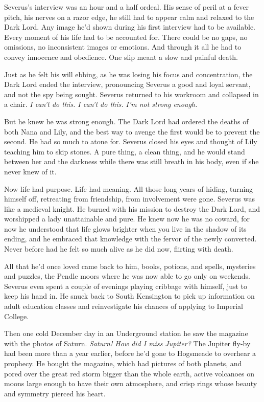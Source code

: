 Severus's interview was an hour and a half ordeal. His sense of peril at a fever pitch, his nerves on a razor edge, he still had to appear calm and relaxed to the Dark Lord. Any image he'd shown during his first interview had to be available. Every moment of his life had to be accounted for. There could be no gaps, no omissions, no inconsistent images or emotions. And through it all he had to convey innocence and obedience. One slip meant a slow and painful death.

Just as he felt his will ebbing, as he was losing his focus and concentration, the Dark Lord ended the interview, pronouncing Severus a good and loyal servant, and not the spy being sought. Severus returned to his workroom and collapsed in a chair. \emph{I can't do this. I can't do this. I'm not strong enough.}

But he knew he was strong enough. The Dark Lord had ordered the deaths of both Nana and Lily, and the best way to avenge the first would be to prevent the second. He had so much to atone for. Severus closed his eyes and thought of Lily teaching him to skip stones. A pure thing, a clean thing, and he would stand between her and the darkness while there was still breath in his body, even if she never knew of it.

Now life had purpose. Life had meaning. All those long years of hiding, turning himself off, retreating from friendship, from involvement were gone. Severus was like a medieval knight. He burned with his mission to destroy the Dark Lord, and worshipped a lady unattainable and pure. He knew now he was no coward, for now he understood that life glows brighter when you live in the shadow of its ending, and he embraced that knowledge with the fervor of the newly converted. Never before had he felt so much alive as he did now, flirting with death.

All that he'd once loved came back to him, books, potions, and spells, mysteries and puzzles, the Pendle moors where he was now able to go only on weekends. Severus even spent a couple of evenings playing cribbage with himself, just to keep his hand in. He snuck back to South Kensington to pick up information on adult education classes and reinvestigate his chances of applying to Imperial College.

Then one cold December day in an Underground station he saw the magazine with the photos of Saturn. \emph{Saturn! How did I miss Jupiter?} The Jupiter fly-by had been more than a year earlier, before he'd gone to Hogsmeade to overhear a prophecy. He bought the magazine, which had pictures of both planets, and pored over the great red storm bigger than the whole earth, active volcanoes on moons large enough to have their own atmosphere, and crisp rings whose beauty and symmetry pierced his heart.

